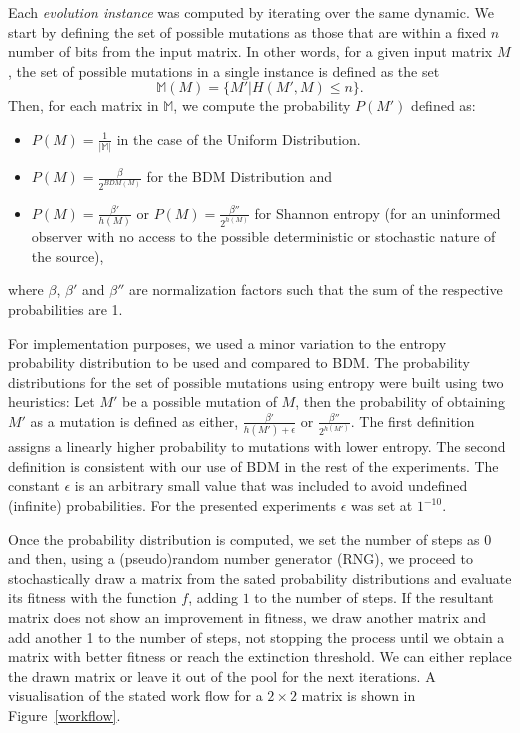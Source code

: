 \documentclass[10pt]{article}
\begin{document}
\noindent{}Each \textit{evolution instance} was computed by iterating over the same dynamic. We start by defining the set of possible mutations as those that are within a fixed $n$ number of bits from the input matrix. In other words, for a given input matrix $M$, the set of possible mutations in a single instance is defined as the set $$\mathbb{M}(M)=\{M'|H(M',M)\leq n\}.$$  Then, for each matrix in $\mathbb{M}$, we compute the probability $P(M')$ defined as:
\begin{itemize}
\item $P(M)=\frac{1}{|\mathbb{M}|}$ in the case of the Uniform Distribution. 
\item $P(M)=\frac{\beta}{2^{BDM(M)}}$ for the BDM Distribution and
\item $P(M)=\frac{\beta'}{h(M)}$ or $P(M)=\frac{\beta''}{2^{h(M)}}$ for Shannon entropy (for an uninformed observer with no access to the possible deterministic or stochastic nature of the source),
\end{itemize}
where $\beta$, $\beta'$ and $\beta''$ are normalization factors such that the sum of the respective probabilities are 1.

For implementation purposes, we used a minor variation to the entropy probability distribution to be used and compared to BDM. The probability distributions for the set of possible mutations using entropy were built using two heuristics: Let \(M'\) be a possible mutation of \(M\), then the probability of obtaining \(M'\) as a mutation is defined as either, \(\frac{\beta'}{h(M')+\epsilon}\) or \(\frac{\beta''}{2^{h(M')}}\). The first definition assigns a linearly higher probability to mutations with lower entropy. The second definition is consistent with our use of BDM in the rest of the experiments. The constant \(\epsilon\) is an arbitrary small value that was included to avoid undefined (infinite) probabilities. For the presented experiments \(\epsilon\) was set at \(1^{-10}\).

Once the probability distribution is computed, we set the number of steps as 0 and then, using a (pseudo)random number generator (RNG), we proceed to stochastically draw a matrix from the sated probability distributions and evaluate its fitness with the function $f$, adding $1$ to the number of steps. If the resultant matrix does not show an improvement in fitness, we draw another matrix and add another 1 to the number of steps, not stopping the process until we obtain a matrix with better fitness or  reach the extinction threshold. We can either replace the drawn matrix or leave it out of the pool for the next iterations. A visualisation of the stated work flow for a $2 \times 2$ matrix is shown in Figure~\ref{workflow}.
\end{document}
